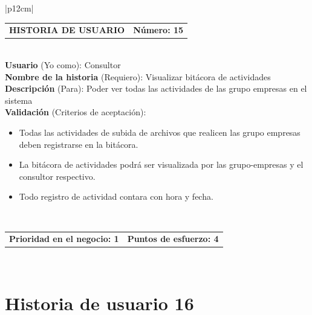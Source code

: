 \documentclass[11pt,letterpaper]{report}
\begin{document}
	\begin{center}	
		\begin{tabular}{|p{12cm}|}
			\hline
			\begin{tabular}{c|c}
				\textbf{HISTORIA DE USUARIO} & \textbf{Número: 15} \\
			\end{tabular} \\ \hline
			\textbf{Usuario} (Yo como): Consultor \\ \hline
			\textbf{Nombre de la historia} (Requiero): Visualizar bitácora de actividades\\ \hline
			\textbf{Descripción} (Para): Poder ver todas las actividades de las grupo empresas en el sistema \\ \hline
			\textbf{Validación} (Criterios de aceptación): \\
			\begin{minipage}{12cm}
				\begin{itemize}
					\item Todas las actividades de subida de archivos que realicen las grupo empresas deben registrarse en la bitácora.
					\item La bitácora de actividades podrá ser visualizada por las grupo-empresas y el consultor respectivo.
					\item Todo registro de actividad contara con hora y fecha.
				\end{itemize}
			\end{minipage} \\ \hline
			\begin{tabular}{c|c}
				\textbf{Prioridad en el negocio: 1} & \textbf{Puntos de esfuerzo: 4} \\
			\end{tabular} \\ \hline
		\end{tabular}
	\end{center}
	
	\section{Historia de usuario 16}
	
\end{document}
